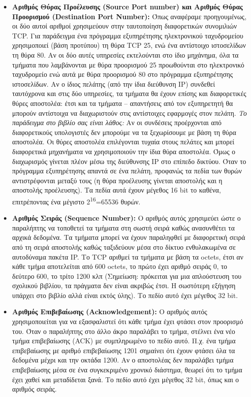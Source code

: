 \begin{itemize}
\item \textbf{Αριθμός Θύρας Προέλευσης (Source Port number) και Αριθμός Θύρας Προορισμού (Destination Port Number):} Όπως αναφέραμε προηγουμένως, οι δύο αυτοί αριθμοί χρησιμεύουν στην ταυτοποίηση διαφορετικών συνομιλιών TCP. Για παράδειγμα ένα πρόγραμμα εξυπηρέτησης ηλεκτρονικού ταχυδρομείου χρησιμοποιεί (βάση προτύπου) τη θύρα TCP 25, ενώ ένα αντίστοιχο ιστοσελίδων τη θύρα 80. Αν οι δύο αυτές υπηρεσίες εκτελούνται στο ίδιο μηχάνημα, όλα τα τμήματα που λαμβάνονται με θύρα προορισμού 25 προωθούνται στο ηλεκτρονικό ταχυδρομείο ενώ αυτά με θύρα προορισμού 80 στο πρόγραμμα εξυπηρέτησης ιστοσελίδων. Αν ο ίδιος πελάτης (από την ίδια διεύθυνση IP) συνδεθεί ταυτόχρονα και στις δύο υπηρεσίες, τα τμήματα θα έχουν επίσης και διαφορετικές θύρες αποστολέα: έτσι και τα τμήματα -- απαντήσεις από τον εξυπηρετητή θα μπορούν αντίστοιχα να διαχωριστούν στις αντίστοιχες εφαρμογές στον πελάτη. \emph{Το παράδειγμα στο βιβλίο σας είναι λάθος:} Αν οι συνδέσεις προέρχονται από διαφορετικούς υπολογιστές δεν μπορούμε να τα ξεχωρίσουμε με βάση τη θύρα αποστολέα. Οι θύρες αποστολέα επιλέγονται τυχαία στους πελάτες και μπορεί διαφορετικά μηχανήματα να χρησιμοποιούν την ίδια θύρα αποστολέα. Όμως ο διαχωρισμός γίνεται πλέον μέσω της διεύθυνσης IP στο επίπεδο δικτύου. Όταν το πρόγραμμα εξυπηρέτησης απαντά σε ένα πελάτη, προφανώς τα πεδία των θυρών αντιστρέφονται μεταξύ τους (η θύρα προέλευσης γίνεται αποστολής και η αποστολής προέλευσης). Τα πεδία αυτά έχουν μέγεθος 16 bit το καθένα, επιτρέποντας ένα μέγιστο 2\textsuperscript{16}=65536 θυρών.
\item \textbf{Αριθμός Σειράς (Sequence Number):} Ο αριθμός αυτός χρησιμεύει ώστε ο παραλήπτης να τοποθετεί τα τμήματα στη σωστή σειρά καθώς ανασυνθέτει τα αρχικά δεδομένα. Τα τμήματα μπορεί να έχουν παραληφθεί με διαφορετική σειρά από τη σειρά αποστολής καθώς ταξιδεύουν μέσα στο δίκτυο ενθυλακωμένα σε αυτοδύναμα πακέτα IP. Το TCP αριθμεί τα τμήματα με βάση τα octets, έτσι αν κάθε τμήμα αποτελείται από 600 octets, το πρώτο έχει αριθμό σειράς 0, το δεύτερο 600, το τρίτο 1200 κλπ (Σημείωση: πρόκειται για μια απλούστευση του σχολικού βιβλίου, τα πράγματα δεν είναι ακριβώς έτσι. Η σωστότερη εξήγηση υπάρχει στο βιβλίο αλλά είναι εκτός ύλης). Το πεδίο αυτό έχει μέγεθος 32 bit.
\item \textbf{Αριθμός Επιβεβαίωσης (Acknowledgement):} Ο αριθμός αυτός χρησιμοποιείται για να εξασφαλιστεί ότι κάθε τμήμα έχει φτάσει στον προορισμό του. Όταν ο παραλήπτης στο άλλο άκρο παραλάβει το τμήμα, στέλνει ένα νέο τμήμα επιβεβαίωσης (ACK) με συμπληρωμένο το πεδίο αυτό. Π.χ. ένα τμήμα επιβεβαίωσης με αριθμό επιβεβαίωσης 1201 σημαίνει ότι έχουν φτάσει όλα τα δεδομένα μέχρι και την οκτάδα 1200. Αν ο αποστολέας δεν παραλάβει τμήμα επιβεβαίωσης μέσα σε ένα συγκεκριμένο χρονικό διάστημα, θεωρεί ότι το τμήμα έχει χαθεί και μεταδίδεται ξανά. Το πεδίο αυτό έχει μέγεθος 32 bit, όπως και ο αριθμός σειράς.

\end{itemize}
